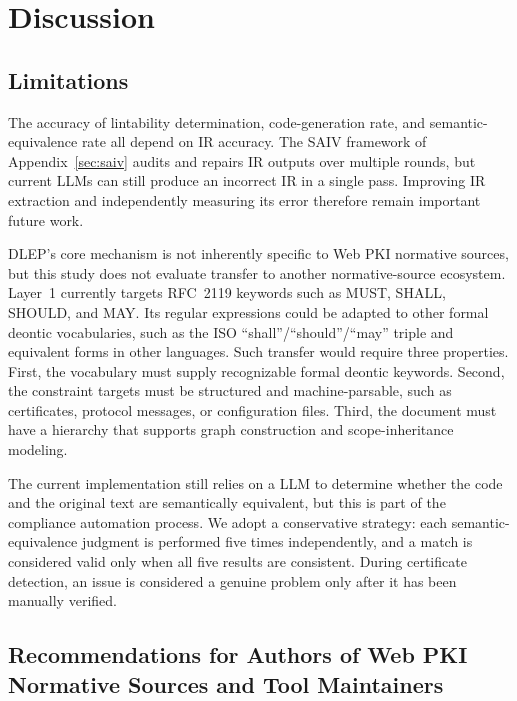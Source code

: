 \section{Discussion}
\label{sec:discussion}

\subsection{Limitations}
\label{subsec:limitations}

The accuracy of lintability determination, code-generation rate, and semantic-equivalence
rate all depend on IR accuracy. The SAIV framework of Appendix~\ref{sec:saiv} audits and repairs IR outputs over multiple
rounds, but current LLMs can still produce an incorrect IR in a single pass.
Improving IR extraction and independently measuring its error therefore remain
important future work.

DLEP's core mechanism is not inherently specific to Web PKI normative sources, but this
study does not evaluate transfer to another normative-source ecosystem. Layer~1
currently targets RFC~2119 keywords such as MUST, SHALL, SHOULD, and MAY. Its
regular expressions could be adapted to other formal deontic vocabularies, such
as the ISO ``shall''/``should''/``may'' triple and equivalent forms in other
languages. Such transfer would require three properties. First, the vocabulary
must supply recognizable formal deontic keywords. Second, the constraint targets
must be structured and machine-parsable, such as certificates, protocol
messages, or configuration files. Third, the document must have a
hierarchy that supports graph construction and scope-inheritance modeling.

The current implementation still relies on a LLM to determine whether the code and the original text are semantically equivalent, but this is part of the compliance automation process. We adopt a conservative strategy: each semantic-equivalence judgment is performed five times independently, and a match is considered valid only when all five results are consistent. During certificate detection, an issue is considered a genuine problem only after it has been manually verified.

\subsection{Recommendations for Authors of Web PKI Normative Sources and Tool Maintainers}
\label{subsec:recommendations}

